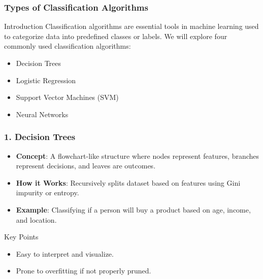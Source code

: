 \documentclass{beamer}
\begin{document}
\begin{frame}[fragile]
    \frametitle{Types of Classification Algorithms}
    \begin{block}{Introduction}
        Classification algorithms are essential tools in machine learning used to categorize data into predefined classes or labels. 
        We will explore four commonly used classification algorithms:
        \begin{itemize}
            \item Decision Trees
            \item Logistic Regression
            \item Support Vector Machines (SVM)
            \item Neural Networks
        \end{itemize}
    \end{block}
\end{frame}

\begin{frame}[fragile]
    \frametitle{1. Decision Trees}
    \begin{itemize}
        \item \textbf{Concept}: A flowchart-like structure where nodes represent features, branches represent decisions, and leaves are outcomes.
        \item \textbf{How it Works}: Recursively splits dataset based on features using Gini impurity or entropy.
        \item \textbf{Example}: Classifying if a person will buy a product based on age, income, and location.
    \end{itemize}
    
    \begin{block}{Key Points}
        \begin{itemize}
            \item Easy to interpret and visualize.
            \item Prone to overfitting if not properly pruned.
        \end{itemize}
    \end{block}
\end{frame}
\end{document}
